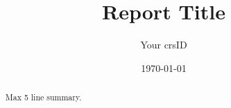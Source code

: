 \documentclass[12pt,a4paper]{report}
\title{Report Title}
\author{Your crsID}
\date{\today}
\begin{document}
\maketitle

\begin{abstract}
Max 5 line summary.
\end{abstract}

\tableofcontents

\chapter{}

\chapter{}

\chapter{}

\chapter{}

\chapter{}
\end{document}
